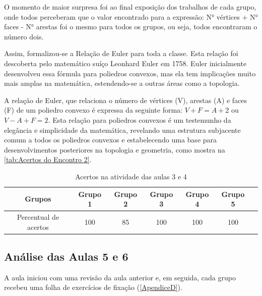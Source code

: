 O momento de maior surpresa foi ao final exposição dos trabalhos de cada grupo, onde todos perceberam que o valor encontrado para a expressão: N° vértices + N° faces - N° arestas foi o mesmo para todos os grupos, ou seja, todos encontraram o número dois.

Assim, formalizou-se a Relação de Euler para toda a classe. Esta relação foi descoberta pelo matemático suíço Leonhard Euler em 1758. Euler inicialmente desenvolveu essa fórmula para poliedros convexos, mas ela tem implicações muito mais amplas na matemática, estendendo-se a outras áreas como a topologia.

A relação de Euler, que relaciona o número de vértices (V), arestas (A) e faces (F) de um poliedro convexo é expressa da seguinte forma: \textcolor[HTML]{0000FF}{$V + F = A + 2$} ou \textcolor[HTML]{0000FF}{$V - A + F = 2$}. Esta relação para poliedros convexos é um testemunho da elegância e simplicidade da matemática, revelando uma estrutura subjacente comum a todos os poliedros convexos e estabelecendo uma base para desenvolvimentos posteriores na topologia e geometria, como mostra na \autoref{tab:Acertos do Encontro 2}.

\begin{table}[htbp] \centering
    \caption{Acertos na atividade das aulas 3 e 4} \label{tab:Acertos do Encontro 2} \begin{tabular}{|c|c|c|c|c|c|c|}
        \hline
        \textbf{Grupos}       & \textbf{Grupo 1} & \textbf{Grupo 2} & \textbf{Grupo 3} & \textbf{Grupo 4} & \textbf{Grupo 5} \\
        \hline
        Percentual de acertos & 100              & 85               & 100              & 100              & 100              \\
        \hline
    \end{tabular}
    \legend{\legendaTabela}
\end{table}

\subsection{Análise das Aulas 5 e 6}

A aula iniciou com uma revisão da aula anterior e, em seguida, cada grupo recebeu uma folha de exercícios de fixação (\autoref{ApendiceD}).


